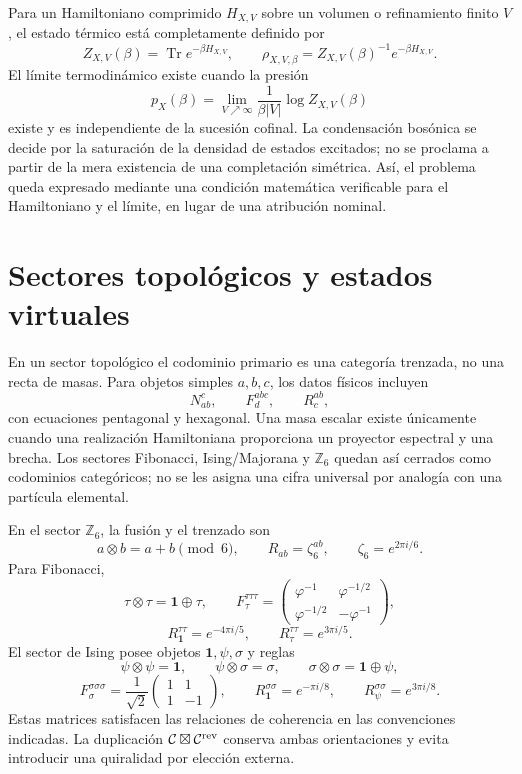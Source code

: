 Para un Hamiltoniano comprimido \(H_{X,V}\) sobre un volumen o refinamiento
finito \(V\), el estado térmico está completamente definido por
\[
 Z_{X,V}(\beta)=\operatorname{Tr}e^{-\beta H_{X,V}},
 \qquad
 \rho_{X,V,\beta}=Z_{X,V}(\beta)^{-1}e^{-\beta H_{X,V}}.
\]
El límite termodinámico existe cuando la presión
\[
 p_X(\beta)=\lim_{V\nearrow\infty}
 \frac1{\beta |V|}\log Z_{X,V}(\beta)
\]
existe y es independiente de la sucesión cofinal. La condensación bosónica se
decide por la saturación de la densidad de estados excitados; no se proclama a
partir de la mera existencia de una completación simétrica. Así, el problema
queda expresado mediante una condición matemática verificable para el
Hamiltoniano y el límite, en lugar de una atribución nominal.

\section{Sectores topológicos y estados virtuales}

En un sector topológico el codominio primario es una categoría trenzada, no
una recta de masas. Para objetos simples \(a,b,c\), los datos físicos incluyen
\[
 N_{ab}^{c},\qquad F^{abc}_{d},\qquad R^{ab}_{c},
\]
con ecuaciones pentagonal y hexagonal. Una masa escalar existe únicamente
cuando una realización Hamiltoniana proporciona un proyector espectral y una
brecha. Los sectores Fibonacci, Ising/Majorana y \(\mathbb Z_6\) quedan así
cerrados como codominios categóricos; no se les asigna una cifra universal
por analogía con una partícula elemental.

En el sector \(\mathbb Z_6\), la fusión y el trenzado son
\[
 a\otimes b=a+b\pmod 6,
 \qquad
 R_{ab}=\zeta_6^{ab},
 \qquad \zeta_6=e^{2\pi i/6}.
\]
Para Fibonacci,
\[
 \tau\otimes\tau=\mathbf 1\oplus\tau,
 \qquad
 F_\tau^{\tau\tau\tau}=
 \begin{pmatrix}
 \varphi^{-1}&\varphi^{-1/2}\\
 \varphi^{-1/2}&-\varphi^{-1}
 \end{pmatrix},
\]
\[
 R_{\mathbf1}^{\tau\tau}=e^{-4\pi i/5},
 \qquad
 R_\tau^{\tau\tau}=e^{3\pi i/5}.
\]
El sector de Ising posee objetos \(\mathbf1,\psi,\sigma\) y reglas
\[
 \psi\otimes\psi=\mathbf1,
 \qquad
 \psi\otimes\sigma=\sigma,
 \qquad
 \sigma\otimes\sigma=\mathbf1\oplus\psi,
\]
\[
 F_\sigma^{\sigma\sigma\sigma}
 =\frac1{\sqrt2}
 \begin{pmatrix}1&1\\1&-1\end{pmatrix},
 \qquad
 R_{\mathbf1}^{\sigma\sigma}=e^{-\pi i/8},
 \qquad
 R_\psi^{\sigma\sigma}=e^{3\pi i/8}.
\]
Estas matrices satisfacen las relaciones de coherencia en las convenciones
indicadas. La duplicación
\(\mathcal C\boxtimes\mathcal C^{\rm rev}\) conserva ambas orientaciones y
evita introducir una quiralidad por elección externa.

